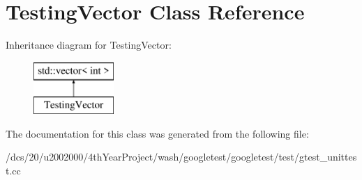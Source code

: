 \hypertarget{classTestingVector}{}\section{Testing\+Vector Class Reference}
\label{classTestingVector}
Inheritance diagram for Testing\+Vector\+:\begin{figure}[H]
\begin{center}
\leavevmode
\includegraphics[height=2.000000cm]{classTestingVector}
\end{center}
\end{figure}


The documentation for this class was generated from the following file\+:\begin{DoxyCompactItemize}
\item 
/dcs/20/u2002000/4th\+Year\+Project/wash/googletest/googletest/test/gtest\+\_\+unittest.\+cc\end{DoxyCompactItemize}
